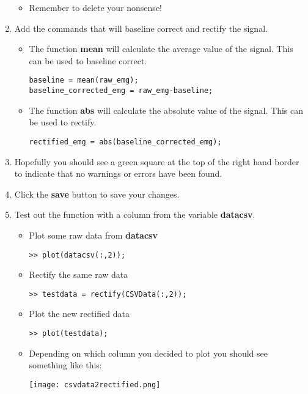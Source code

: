 \documentclass[12pt,a4paper]{article}
\begin{document}
\begin{enumerate}
\begin{itemize}
		\item Remember to delete your nonsense!
	\end{itemize}
	\item Add the commands that will baseline correct and rectify the signal.
	\begin{itemize}
		\item The function \textbf{mean} will calculate the average value of the signal.  This can be used to baseline correct.
		\begin{lstlisting}[style=Matlab-editor]
baseline = mean(raw_emg);
baseline_corrected_emg = raw_emg-baseline;
		\end{lstlisting}
		\item The function \textbf{abs} will calculate the absolute value of the signal.  This can be used to rectify.
		\begin{lstlisting}[style=Matlab-editor]
rectified_emg = abs(baseline_corrected_emg);
		\end{lstlisting}			
	\end{itemize}
	\item Hopefully you should see a green square at the top of the right hand border to indicate that no warnings or errors have been found.	
	\item Click the \textbf{save} button to save your changes.
	\item Test out the function with a column from the variable \textbf{datacsv}.
	\begin{itemize}
		\item Plot some raw data from \textbf{datacsv}
		\begin{lstlisting}[style=Matlab-editor]
>> plot(datacsv(:,2));
		\end{lstlisting}
		\item Rectify the same raw data
		\begin{lstlisting}[style=Matlab-editor]
>> testdata = rectify(CSVData(:,2));
		\end{lstlisting}	
		\item Plot the new rectified data
		\begin{lstlisting}[style=Matlab-editor]
>> plot(testdata);
		\end{lstlisting}	
		\item Depending on which column you decided to plot you should see something like this:
		\begin{center}
			\texttt{[image: csvdata2rectified.png]}
		\end{center}
	\end{itemize}	
\end{enumerate}
\end{document}
